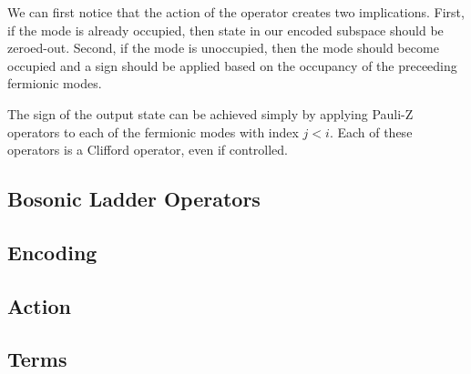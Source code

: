 We can first notice that the action of the operator creates two implications.
First, if the mode is already occupied, then state in our encoded subspace should be zeroed-out. 
Second, if the mode is unoccupied, then the mode should become occupied and a sign should be applied based on the occupancy of the preceeding fermionic modes.


The sign of the output state can be achieved simply by applying Pauli-Z operators to each of the fermionic modes with index $j < i$.
Each of these operators is a Clifford operator, even if controlled.


\subsection{Bosonic Ladder Operators}

\subsection{Encoding}


\subsection{Action}


\subsection{Terms}


